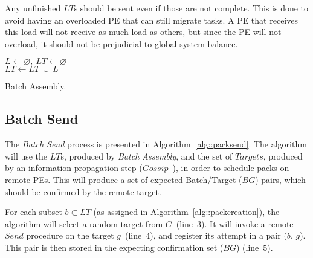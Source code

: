 Any unfinished $LT$s should be sent even if those are not complete.
This is done to avoid having an overloaded PE that can still migrate tasks.
A PE that receives this load will not receive as much load as others, but since the PE will not overload, it should not be prejudicial to global system balance.

\begin{algorithm}[b]
    \DontPrintSemicolon
    $L \gets \varnothing,\ LT \gets \varnothing$ \\
    $LT \gets LT\ \cup\ L$   
    \caption{Batch Assembly.} 
    \label{alg::packcreation}
\end{algorithm}

\subsection{Batch Send} \label{sec:algo:sending}

The \textit{Batch Send} process is presented in Algorithm~\ref{alg::packsend}.
The algorithm will use the $LT$s, produced by \textit{Batch Assembly}, and the set of $Targets$, produced by an information propagation step ($Gossip$~\cite{gossip}), in order to schedule packs on remote PEs.
This will produce a set of expected Batch/Target ($BG$) pairs, which should be confirmed by the remote target.

For each subset $b \subset LT$ (as assigned in Algorithm~\ref{alg::packcreation}), the algorithm will select a random target from $G$~(line~$3$).
It will invoke a remote $Send$ procedure on the target $g$~(line~$4$), and register its attempt in a pair ($b$, $g$).
This pair is then stored in the expecting confirmation set ($BG$) (line~$5$).

